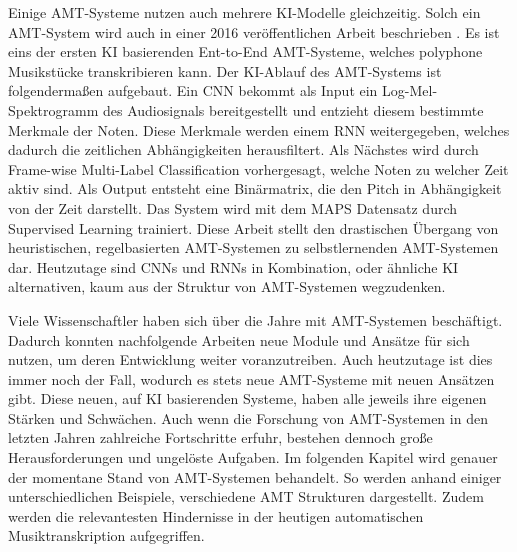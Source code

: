 Einige AMT-Systeme nutzen auch mehrere KI-Modelle gleichzeitig.
Solch ein AMT-System wird auch in einer 2016 veröffentlichen Arbeit beschrieben \cite{sigtia2016end}.
Es ist eins der ersten KI basierenden Ent-to-End AMT-Systeme, welches polyphone Musikstücke transkribieren kann.
Der KI-Ablauf des AMT-Systems ist folgendermaßen aufgebaut.
Ein CNN bekommt als Input ein Log-Mel-Spektrogramm des Audiosignals bereitgestellt
und entzieht diesem bestimmte Merkmale der Noten.
Diese Merkmale werden einem RNN weitergegeben, welches dadurch die zeitlichen Abhängigkeiten herausfiltert.
Als Nächstes wird durch Frame-wise Multi-Label Classification vorhergesagt, welche Noten zu welcher Zeit aktiv sind.
Als Output entsteht eine Binärmatrix, die den Pitch in Abhängigkeit von der Zeit darstellt.
Das System wird mit dem MAPS Datensatz durch Supervised Learning trainiert.
Diese Arbeit stellt den drastischen Übergang von heuristischen, regelbasierten AMT-Systemen
zu selbstlernenden AMT-Systemen dar.
Heutzutage sind CNNs und RNNs in Kombination, oder ähnliche KI alternativen, kaum aus der Struktur von AMT-Systemen wegzudenken.

Viele Wissenschaftler haben sich über die Jahre mit AMT-Systemen beschäftigt.
Dadurch konnten nachfolgende Arbeiten neue Module und Ansätze für sich nutzen, um deren Entwicklung weiter voranzutreiben.
Auch heutzutage ist dies immer noch der Fall, wodurch es stets neue AMT-Systeme mit neuen Ansätzen gibt.
Diese neuen, auf KI basierenden Systeme, haben alle jeweils ihre eigenen Stärken und Schwächen.
Auch wenn die Forschung von AMT-Systemen in den letzten Jahren zahlreiche Fortschritte erfuhr,
bestehen dennoch große Herausforderungen und ungelöste Aufgaben.
Im folgenden Kapitel wird genauer der momentane Stand von AMT-Systemen behandelt.
So werden anhand einiger unterschiedlichen Beispiele, verschiedene AMT Strukturen dargestellt.
Zudem werden die relevantesten Hindernisse in der heutigen automatischen Musiktranskription aufgegriffen.